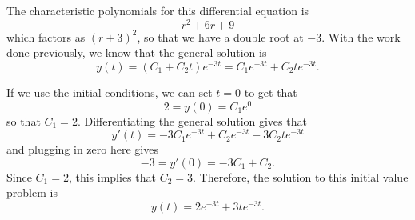 \documentclass{ximera}
\begin{document}
\begin{exampleSol}
    The characteristic polynomials for this differential equation is 
    \begin{equation*}
        r^2 + 6r + 9
    \end{equation*}
    which factors as $(r+3)^2$, so that we have a double root at $-3$. With the work done previously, we know that the general solution is
    \begin{equation*}
        y(t) = (C_1 + C_2t)e^{-3t} = C_1e^{-3t} + C_2te^{-3t}.
    \end{equation*} 
    
    If we use the initial conditions, we can set $t=0$ to get that
    \begin{equation*}
        2 = y(0) = C_1 e^0
    \end{equation*}
    so that $C_1 = 2$. Differentiating the general solution gives that
    \begin{equation*}
        y'(t) = -3C_1e^{-3t} + C_2e^{-3t} -3C_2te^{-3t}
    \end{equation*}
    and plugging in zero here gives
    \begin{equation*}
        -3 = y'(0) = -3C_1 + C_2.
    \end{equation*}
    Since $C_1 = 2$, this implies that $C_2 = 3$. Therefore, the solution to this initial value problem is
    \begin{equation*}
        y(t) = 2e^{-3t} + 3te^{-3t}.
    \end{equation*}
\end{exampleSol}
\end{document}

